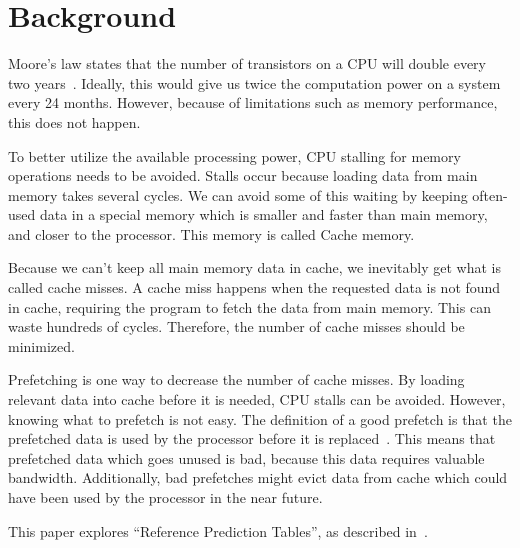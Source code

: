 \section{Background} %


Moore's law states that the number of transistors on a CPU will double
every two years~\cite{moore}. Ideally, this would give us twice the
computation power on a system every 24 months. However, because of
limitations such as memory performance, this does not happen.

To better utilize the available processing power, CPU stalling for
memory operations needs to be avoided. Stalls occur because loading
data from main memory takes several cycles. We can avoid some of this
waiting by keeping often-used data in a special memory which is
smaller and faster than main memory, and closer to the processor. This
memory is called Cache memory.

Because we can't keep all main memory data in cache, we inevitably get
what is called cache misses. A cache miss happens when the requested
data is not found in cache, requiring the program to fetch the data
from main memory. This can waste hundreds of cycles. Therefore, the
number of cache misses should be minimized.

Prefetching is one way to decrease the number of cache misses. By
loading relevant data into cache before it is needed, CPU stalls can
be avoided. However, knowing what to prefetch is not easy. The
definition of a good prefetch is that the prefetched data is used by
the processor before it is
replaced~\cite{srinivasan_davidson_tyson_2004}. This means that
prefetched data which goes unused is bad, because this data requires
valuable bandwidth. Additionally, bad prefetches might evict data from
cache which could have been used by the processor in the near future.

This paper explores ``Reference Prediction Tables'', as
described in~\cite{chen_baer_1995}.

